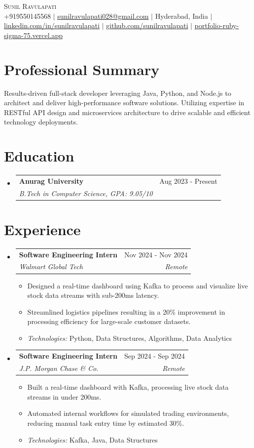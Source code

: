 \documentclass[letterpaper,11pt]{article}
\makeatletter
\newcommand{\resumeItem}[1]{
  \item\small{#1 \vspace{-2pt}}
}
\newcommand{\resumeSubheading}[4]{
  \vspace{-2pt}\item
    \begin{tabular*}{0.97\textwidth}[t]{l@{\extracolsep{\fill}}r}
      \textbf{#1} & #2 \\
      \textit{\small#3} & \textit{\small #4} \\
    \end{tabular*}\vspace{-7pt}
}
\newcommand{\resumeSubHeadingListStart}{\begin{itemize}[leftmargin=0.15in, label={}]}
\newcommand{\resumeSubHeadingListEnd}{\end{itemize}}
\newcommand{\resumeItemListStart}{\begin{itemize}}
\newcommand{\resumeItemListEnd}{\end{itemize}\vspace{-5pt}}
\makeatother
\begin{document}
\begin{center}
    {\Huge \scshape Sunil Ravulapati} \\ \vspace{1pt}
    \small +919550145568 $|$ \href{mailto:sunilravulapati028@gmail.com}{sunilravulapati028@gmail.com} $|$ Hyderabad, India $|$ \href{https://linkedin.com/in/sunilravulapati}{linkedin.com/in/sunilravulapati} $|$ \href{https://github.com/sunilravulapati}{github.com/sunilravulapati} $|$ \href{https://portfolio-ruby-sigma-75.vercel.app}{portfolio-ruby-sigma-75.vercel.app}
\end{center}


\section{Professional Summary}
\small{Results-driven full-stack developer leveraging Java, Python, and Node.js to architect and deliver high-performance software solutions. Utilizing expertise in RESTful API design and microservices architecture to drive scalable and efficient technology deployments.}
\vspace{2pt}


\section{Education}
  \resumeSubHeadingListStart
    \resumeSubheading
      {Anurag University}{Aug 2023 - Present}
      {B.Tech in Computer Science, GPA: 9.05/10}{}
  \resumeSubHeadingListEnd


\section{Experience}
  \resumeSubHeadingListStart
    \resumeSubheading
      {Software Engineering Intern}{Nov 2024 - Nov 2024}
      {Walmart Global Tech}{Remote}
      \resumeItemListStart
        \resumeItem{Designed a real-time dashboard using Kafka to process and visualize live stock data streams with sub-200ms latency.}
        \resumeItem{Streamlined logistics pipelines resulting in a 20\% improvement in processing efficiency for large-scale customer datasets.}
        \resumeItem{\textit{Technologies: }Python, Data Structures, Algorithms, Data Analytics}
      \resumeItemListEnd
    \resumeSubheading
      {Software Engineering Intern}{Sep 2024 - Sep 2024}
      {J.P. Morgan Chase \& Co.}{Remote}
      \resumeItemListStart
        \resumeItem{Built a real-time dashboard with Kafka, processing live stock data streams in under 200ms.}
        \resumeItem{Automated internal workflows for simulated trading environments, reducing manual task entry time by estimated 30\%.}
        \resumeItem{\textit{Technologies: }Kafka, Java, Data Structures}
      \resumeItemListEnd
  \resumeSubHeadingListEnd
\end{document}
